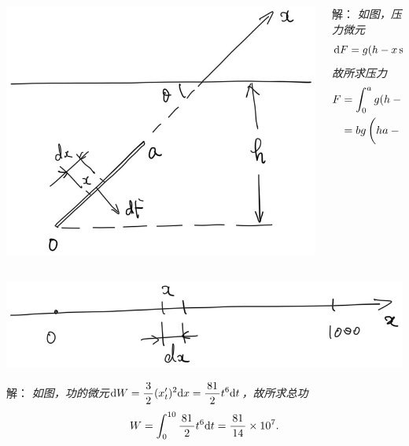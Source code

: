 \begin{frame}
	\linespread{1.5}
	\pause
	
	\bigskip
	
	\begin{columns}
		\begin{column}{.45\textwidth}
			\begin{center}
				\includegraphics[width=\textwidth]{./images/ch6/waterPlane.jpg}
			\end{center}		
		\end{column}
		\begin{column}{.55\textwidth}
			\small 解：\it
			如图，压力微元
			$$\mathrm{d} F=g(h-x\sin\theta)b\mathrm{d} x,$$
			故所求压力
			\begin{align*}
				F&=\displaystyle\int_0^ag(h-x\sin\theta)b\mathrm{d} x\\
				&=bg\left(ha-\displaystyle\frac{\,{a^2}\,}{\,{2}\,}\sin\theta\right).
			\end{align*}
		\end{column}
	\end{columns}
\end{frame}

\begin{frame}
	\linespread{1.5}
	\pause
	
	\begin{center}
		\includegraphics[width=.9\textwidth]{./images/ch6/moveSt.jpg}
	\end{center}
	\small 解：\it
	如图，功的微元$\mathrm{d} W=\displaystyle\frac{\,{3}\,}{\,{2}\,}(x'_t)^2\mathrm{d} x=\displaystyle\frac{\,{81}\,}{\,{2}\,}t^6\mathrm{d} t$，故所求总功
	$$W=\displaystyle\int_0^{10}\displaystyle\frac{\,{81}\,}{\,{2}\,}t^6\mathrm{d} t=\displaystyle\frac{\,{81}\,}{\,{14}\,}\times10^7.$$
\end{frame}

